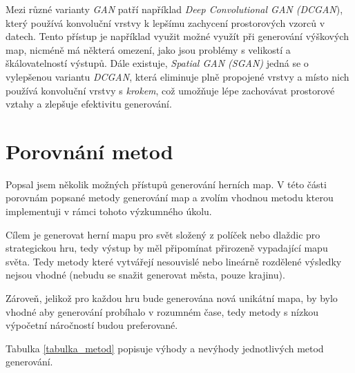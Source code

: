 Mezi různé varianty \textit{GAN} patří například \textit{Deep Convolutional GAN (DCGAN}), který používá konvoluční vrstvy k lepšímu zachycení prostorových vzorců v datech. Tento přístup je například využit možné využít při generování výškových map, nicméně má některá omezení, jako jsou problémy s velikostí a škálovatelností výstupů. Dále existuje, \textit{Spatial GAN (SGAN)} jedná se o vylepšenou variantu \textit{DCGAN}, která eliminuje plně propojené vrstvy a místo nich používá konvoluční vrstvy s \textit{krokem}, což umožňuje lépe zachovávat prostorové vztahy a zlepšuje efektivitu generování. \cite{GANclanek}



\section{Porovnání metod}

Popsal jsem několik možných přístupů generování herních map. V této části porovnám popsané metody generování map a zvolím vhodnou metodu kterou implementuji v rámci tohoto výzkumného úkolu. 

Cílem je generovat herní mapu pro svět složený z políček nebo dlaždic pro strategickou hru, tedy výstup by měl připomínat přirozeně vypadající mapu světa. Tedy metody které vytvářejí nesouvislé nebo lineárně rozdělené výsledky nejsou vhodné (nebudu se snažit generovat města, pouze krajinu). 

Zároveň, jelikož pro každou hru bude generována nová unikátní mapa, by bylo vhodné aby generování probíhalo v rozumném čase, tedy metody s nízkou výpočetní náročností budou preferované.

Tabulka \vref{tabulka_metod} popisuje výhody a nevýhody jednotlivých metod generování.



